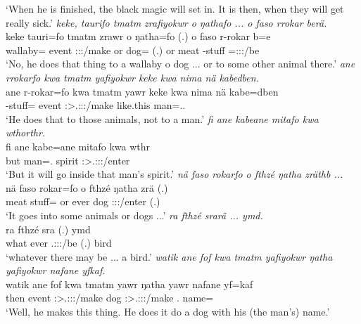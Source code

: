 \begin{exe}
	\trans `When he is finished, the black magic will set in. It is then, when they will get really sick.'
	\emph{keke, taurifo tmatm zrafiyokwr o ŋathafo ... o faso rrokar berä.}\\
	\gll keke tauri=fo tmatm zrawr o ŋatha=fo (.) o faso r-rokar b=e\\
	\Neg{} wallaby=\All{} event \Stsg:\Sbj:\Irr:\Ipfv/make or dog=\All{} (.) or meat \Redup-stuff \Med=\Stpl:\Sbj:\Nonpast:\Ipfv/be\\
	\trans `No, he does that thing to a wallaby o dog ... or to some other animal there.'
	\emph{ane rrokarfo kwa tmatm yafiyokwr keke kwa nima nä kabedben.}\\
	\gll ane r-rokar=fo kwa tmatm yawr keke kwa nima nä kabe=dben\\
	\Dem{} \Redup-stuff=\All{} \Fut{} event \Stsg:\Sbj>\Tsg.\Masc:\Io:\Nonpast:\Ipfv/make \Neg{} \Fut{} like.this \Indf{} man=\Loc.\Anim.\Sg\\
	\trans `He does that to those animals, not to a man.'
	\emph{fi ane kabeane mitafo kwa wthorthr.}\\
	\gll fi ane kabe=ane mitafo kwa wthr\\
	but \Dem{} man=\Poss.\Sg{} spirit \Fut{} \Stsg:\Sbj>\Tsg.\F:\Obj:\Nonpast:\Ipfv/enter\\
	\trans `But it will go inside that man's spirit.'
	\emph{nä faso rokarfo o fthzé ŋatha zräthb ...}\\
	\gll nä faso rokar=fo o fthzé ŋatha zrä (.)\\
	\Indf{} meat stuff=\All{} or ever dog \Stsg:\Sbj:\Nonpast:\Pfv/enter (.)\\
	\trans `It goes into some animals or dogs ...'
	\emph{ra fthzé srarä ... ymd.}\\
	\gll ra fthzé sra (.) ymd\\
	what ever \Tsg.\Masc:\Sbj:\Irr:\Ipfv/be (.) bird\\
	\trans `whatever there may be ... a bird.'
	\emph{watik ane fof kwa tmatm yafiyokwr ŋatha yafiyokwr nafane yfkaf.}\\
	\gll watik ane fof kwa tmatm yawr ŋatha yawr nafane yf=kaf\\
	then \Dem{} \Emph{} \Fut{} event \Stsg:\Sbj>\Tsg.\Masc:\Io:\Nonpast:\Ipfv/make dog \Stsg:\Sbj>\Tsg.\Masc:\Io:\Nonpast:\Ipfv/make \Tsg.\Poss{} name=\Prop\\
	\trans `Well, he makes this thing. He does it do a dog with his (the man's) name.'

\end{exe}
